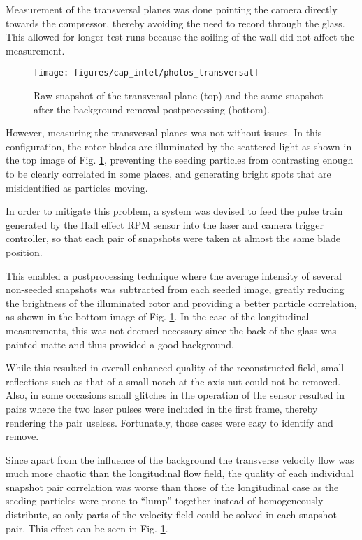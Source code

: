 Measurement of the transversal planes was done pointing the camera directly towards the compressor, thereby avoiding the need to record through the glass. This allowed for longer test runs because the soiling of the wall did not affect the measurement. 

\begin{figure}[!t]
\centering
\texttt{[image: figures/cap\_inlet/photos\_transversal]}
\caption{Raw snapshot of the transversal plane (top) and the same snapshot after the background removal postprocessing (bottom).}
\label{fig:photos_transversal}
\end{figure}

However, measuring the transversal planes was not without issues. In this configuration, the rotor blades are illuminated by the scattered light as shown in the top image of Fig. \ref{fig:photos_transversal}, preventing the seeding particles from contrasting enough to be clearly correlated in some places, and generating bright spots that are misidentified as particles moving.

In order to mitigate this problem, a system was devised to feed the pulse train generated by the Hall effect RPM sensor into the laser and camera trigger controller, so that each pair of snapshots were taken at almost the same blade position.

This enabled a postprocessing technique where the average intensity of several non-seeded snapshots was subtracted from each seeded image, greatly reducing the brightness of the illuminated rotor and providing a better particle correlation, as shown in the bottom image of Fig. \ref{fig:photos_transversal}. In the case of the longitudinal measurements, this was not deemed necessary since the back of the glass was painted matte and thus provided a good background.

While this resulted in overall enhanced quality of the reconstructed field, small reflections such as that of a small notch at the axis nut could not be removed. Also, in some occasions small glitches in the operation of the sensor resulted in pairs where the two laser pulses were included in the first frame, thereby rendering the pair useless. Fortunately, those cases were easy to identify and remove.

Since apart from the influence of the background the transverse velocity flow was much more chaotic than the longitudinal flow field, the quality of each individual snapshot pair correlation was worse than those of the longitudinal case as the seeding particles were prone to ``lump'' together instead of homogeneously distribute, so only parts of the velocity field could be solved in each snapshot pair. This effect can be seen in Fig. \ref{fig:photos_transversal}.

